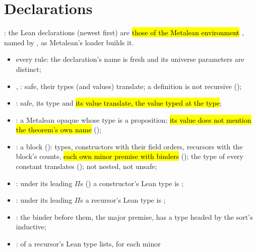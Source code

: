 \section{Declarations}\label{sec:model-env}

\begin{definition}
  \label{def:EraseProof-ProgEnv}
  \leanok
   : the Lean declarations  (newest first) are
  \hl{those of the Metalean environment }, named by , as Metalean's loader builds
  it.
  \begin{itemize}
  \item every rule: the declaration's name is fresh and its universe parameters are
        distinct;
  \item {}, : safe, their types (and values) translate; a definition is not
        recursive ();
  \item {}: safe, its type and \hl{its value translate, the value typed at the
        type};
  \item {}: a Metalean opaque whose type is a proposition; \hl{its value does not mention
        the theorem's own name} ();
  \item {}: a block (): types, constructors with their field orders,
        recursors with the block's counts, \hl{each own minor premise with
         binders} (); the type of every constant
        translates (); not nested, not unsafe;
  \item {}: under its  leading $\Pi$s
        () a constructor's Lean type is ;
  \item {}: under its  leading $\Pi$s a recursor's Lean type
        is ;
  \item {}: the binder before them, the major premise, has a type headed
        by the sort's inductive;
  \item {}:  of a recursor's Lean type lists, for each minor

\end{itemize}
\end{definition}
